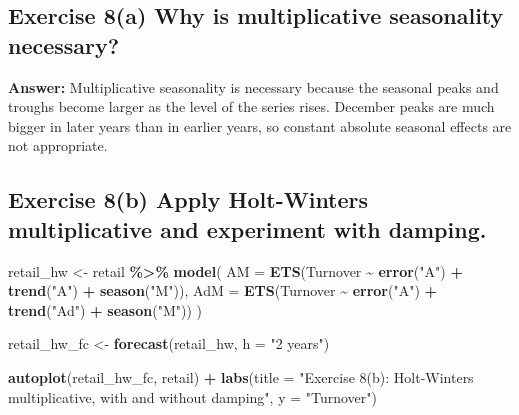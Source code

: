 \documentclass[
  11pt,
]{article}
\newenvironment{Shaded}{\begin{snugshade}}{\end{snugshade}}
\newcommand{\AttributeTok}[1]{\textcolor[rgb]{0.13,0.29,0.53}{#1}}
\newcommand{\FunctionTok}[1]{\textcolor[rgb]{0.13,0.29,0.53}{\textbf{#1}}}
\newcommand{\NormalTok}[1]{#1}
\newcommand{\OtherTok}[1]{\textcolor[rgb]{0.56,0.35,0.01}{#1}}
\newcommand{\SpecialCharTok}[1]{\textcolor[rgb]{0.81,0.36,0.00}{\textbf{#1}}}
\newcommand{\StringTok}[1]{\textcolor[rgb]{0.31,0.60,0.02}{#1}}
\begin{document}
\subsection{Exercise 8(a) Why is multiplicative seasonality
necessary?}\label{exercise-8a-why-is-multiplicative-seasonality-necessary}

\textbf{Answer:} Multiplicative seasonality is necessary because the
seasonal peaks and troughs become larger as the level of the series
rises. December peaks are much bigger in later years than in earlier
years, so constant absolute seasonal effects are not appropriate.

\subsection{Exercise 8(b) Apply Holt-Winters multiplicative and
experiment with
damping.}\label{exercise-8b-apply-holt-winters-multiplicative-and-experiment-with-damping.}

\begin{Shaded}
\begin{Highlighting}[]
\NormalTok{retail\_hw }\OtherTok{\textless{}{-}}\NormalTok{ retail }\SpecialCharTok{\%\textgreater{}\%}
  \FunctionTok{model}\NormalTok{(}
    \AttributeTok{AM =} \FunctionTok{ETS}\NormalTok{(Turnover }\SpecialCharTok{\textasciitilde{}} \FunctionTok{error}\NormalTok{(}\StringTok{"A"}\NormalTok{) }\SpecialCharTok{+} \FunctionTok{trend}\NormalTok{(}\StringTok{"A"}\NormalTok{) }\SpecialCharTok{+} \FunctionTok{season}\NormalTok{(}\StringTok{"M"}\NormalTok{)),}
    \AttributeTok{AdM =} \FunctionTok{ETS}\NormalTok{(Turnover }\SpecialCharTok{\textasciitilde{}} \FunctionTok{error}\NormalTok{(}\StringTok{"A"}\NormalTok{) }\SpecialCharTok{+} \FunctionTok{trend}\NormalTok{(}\StringTok{"Ad"}\NormalTok{) }\SpecialCharTok{+} \FunctionTok{season}\NormalTok{(}\StringTok{"M"}\NormalTok{))}
\NormalTok{  )}

\NormalTok{retail\_hw\_fc }\OtherTok{\textless{}{-}} \FunctionTok{forecast}\NormalTok{(retail\_hw, }\AttributeTok{h =} \StringTok{"2 years"}\NormalTok{)}

\FunctionTok{autoplot}\NormalTok{(retail\_hw\_fc, retail) }\SpecialCharTok{+}
  \FunctionTok{labs}\NormalTok{(}\AttributeTok{title =} \StringTok{"Exercise 8(b): Holt{-}Winters multiplicative, with and without damping"}\NormalTok{, }\AttributeTok{y =} \StringTok{"Turnover"}\NormalTok{)}
\end{Highlighting}
\end{Shaded}
\end{document}
